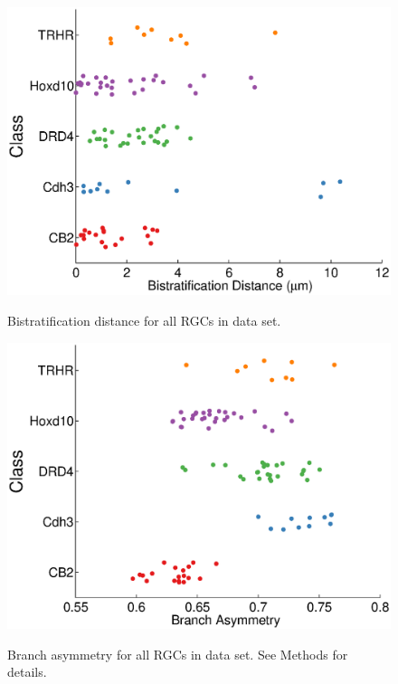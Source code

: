 \documentclass{article}
\begin{document}
\begin{figure}
  \centering
  {\includegraphics[scale=0.75]{Figures/SupFig3/plotFeatures-biStratificationDistance.eps}}
  \caption{Bistratification distance for all RGCs in data set.}
\end{figure}



\begin{figure}
  \centering
  {\includegraphics[scale=0.75]{Figures/SupFig3/plotFeatures-branchAssymetry.eps}}
  \caption{Branch asymmetry for all RGCs in data set. See Methods for details.}
\end{figure}

\clearpage
\end{document}
